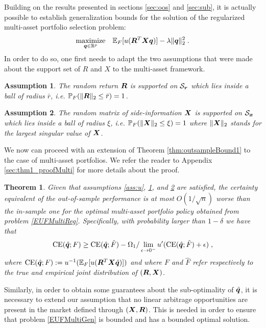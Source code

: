 \documentclass[]{interact}
\theoremstyle{plain}%
\theoremstyle{definition}
\theoremstyle{remark}
\def\Expect{{\mathbb E}}
\def\Prob{{\mathbb P}}
\def\maximize{\mathop{\rm maximize}}
\newcommand{\0}{\V{0}}
\newcommand{\1}{\V{1}}
\renewcommand{\Re}{\mathbb{R}}
\def\CE{\mathop{\rm CE}}
\theoremstyle{plain}
\newtheorem{thm}{Theorem}
\newtheorem{assumption}{Assumption}
\theoremstyle{definition}
\begin{document}
Building on the results presented in sections \ref{sec:oos} and \ref{sec:sub}, it is actually possible to establish generalization bounds for the solution of the regularized multi-asset portfolio selection problem:
\begin{equation}
\maximize_{\vq\in\Re^p}\;\;\;\Expect_\F[u(\vR^T \vX \vq)]-\lambda\|\vq\|_2^2\;.\label{EUFMultiReg}
\end{equation}
In order to do so, one first needs to adapt the two assumptions that were made about the support set of $R$ and $X$ to the multi-asset framework.

\begin{assumption}\label{ass:Rmulti}
  The random return ${\boldsymbol{R}}$ is supported on ${\mathcal{S}_{\boldsymbol{r}}}$ which lies inside a ball of radius $\bar{r}$, i.e. $\Prob_F(\|\vR\|_2\leq \bar{r})=1$.
\end{assumption}

\begin{assumption}\label{ass:Xmulti}
  The random matrix of side-information ${\boldsymbol{X}}$ is supported on ${\mathcal{S}_{\boldsymbol{x}}}$ which lies inside a ball of radius $\xi$, i.e.   $\Prob_F(\|\vX\|_2 \leq \xi)=1$ where $\|{\boldsymbol{X}}\|_2$ stands for the largest singular value of ${\boldsymbol{X}}$.
\end{assumption}

We now can proceed with an extension of Theorem \ref{thm:outsampleBound1} to the case of multi-asset portfolios. We refer the reader to Appendix \ref{sec:thm1_proofMulti} for more details about the proof.

\begin{thm}\label{thm:outsampleBound1:Multi}
  Given that assumptions \ref{ass:u}, \ref{ass:Rmulti}, and \ref{ass:Xmulti}  are satisfied, the
  certainty equivalent of the out-of-sample performance is at most $O(1/\sqrt{n})$ worse
  than the in-sample one for the optimal multi-asset portfolio policy obtained from problem \eqref{EUFMultiReg}. Specifically, with probability larger than $1-\delta$ we have that
  \[ 
    \CE(\vqhat;\F) \geq \CE(\vqhat;\Fhat) -
    \Omega_1/\lim_{\epsilon\to0^-}u'(\CE(\vqhat;\Fhat)+\epsilon)\;,
 \]
  where $\CE(\vqhat;\F):=u^{-1}(\Expect_\F[u(\vR^T\vX \vqhat)])$ and where $F$ and $\hat{F}$ refer respectively to the true and empirical joint distribution of $({\boldsymbol{R}},{\boldsymbol{X}})$.
\end{thm}

Similarly, in order to obtain some guarantees about the sub-optimality of ${\hat{\boldsymbol{q}}}$, it is necessary to extend our assumption that no linear arbitrage opportunities are present in the market defined through $({\boldsymbol{X}},{\boldsymbol{R}})$. This is needed in order to ensure that problem \eqref{EUFMultiGen} is bounded and has a bounded optimal solution.
\end{document}
